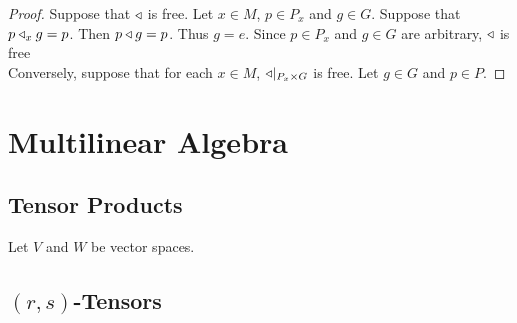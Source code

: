 \documentclass{book}
\begin{document}
\begin{proof}
	Suppose that $\triangleleft$ is free. Let $x \in M$, $p \in P_x$ and $g \in G$. Suppose that $p \triangleleft_x g = p$. Then $p \triangleleft g = p$. Thus $g = e$. Since $p \in P_x$ and $g \in G$ are arbitrary, $\triangleleft$ is free\\
	
	Conversely, suppose that for each $x \in M$, $\triangleleft|_{P_x \times G}$ is free. Let $g \in G$ and $p \in P$.
\end{proof}

















\newpage
	\chapter{Multilinear Algebra}
	
	\section{Tensor Products}
	
	Let $V$ and $W$ be vector spaces. 
	
	
	
	
	
	
	
	
	
	
	
	
	
	
	
	
	
	
	
	
	
	
	
	
	
	
	
	
	
	
	
	
	
	
	
	
	
	
	
	
	
	
	
	
	
	
	
	
	
	
	
	
	
	
	\section{$(r,s)$-Tensors}
	
\end{document}
